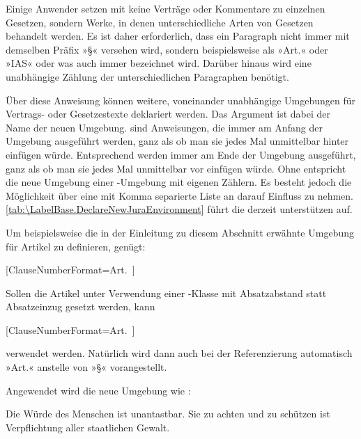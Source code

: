 Einige Anwender setzen mit  keine Verträge oder Kommentare
zu einzelnen Gesetzen, sondern Werke, in denen unterschiedliche Arten von
Gesetzen behandelt werden. Es ist daher erforderlich, dass ein Paragraph
nicht immer mit demselben Präfix »\S« versehen wird, sondern beispielsweise
als »Art.« oder »IAS« oder was auch immer bezeichnet wird. Darüber hinaus wird
eine unabhängige Zählung der unterschiedlichen Paragraphen benötigt.

\begin{Declaration}
\end{Declaration}
Über diese Anweisung können weitere,
voneinander unabhängige Umgebungen für Vertrags- oder Gesetzestexte deklariert
werden.  Das Argument  ist dabei der Name der neuen
Umgebung.  sind Anweisungen, die immer am Anfang der
Umgebung ausgeführt werden, ganz als ob man sie jedes Mal unmittelbar hinter
 einfügen würde. Entsprechend werden
 immer am Ende der Umgebung ausgeführt, ganz als ob man
sie jedes Mal unmittelbar vor  einfügen würde. Ohne
 entspricht die neue Umgebung  einer
-Umgebung mit eigenen Zählern. Es besteht
jedoch die Möglichkeit über eine mit Komma separierte Liste an
 darauf Einfluss zu
nehmen. \autoref{tab:\LabelBase.DeclareNewJuraEnvironment} führt die derzeit
unterstützen  auf.%
\begin{Example}
  Um beispielsweise die in der Einleitung zu diesem Abschnitt erwähnte
  Umgebung für Artikel zu definieren, genügt:
\begin{lstcode}
                 [ClauseNumberFormat=Art.~]{}{}
\end{lstcode}
  Sollen die Artikel unter Verwendung einer \KOMAScript-Klasse mit
  Absatzabstand statt Absatzeinzug gesetzt werden, kann
\begin{lstcode}
                 [ClauseNumberFormat=Art.~]
                 {}{}
\end{lstcode}
  verwendet werden. Natürlich wird dann auch bei der Referenzierung
  automatisch »Art.« anstelle von »\S« vorangestellt.%

  Angewendet wird die neue Umgebung wie
  :
\begin{lstcode}
  \begin{Artikel}
    \Clause{}
    Die Würde des Menschen ist unantastbar. Sie zu
    achten und zu schützen ist Verpflichtung aller
    staatlichen Gewalt.
  \end{Artikel}
\end{lstcode}
\end{Example}%
